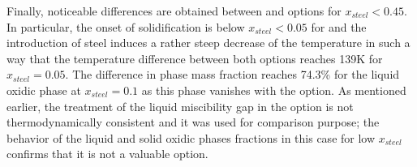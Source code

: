Finally, noticeable differences are obtained between  and  options for $x_{steel} < 0.45$. In particular, the onset of solidification is below $x_{steel} < 0.05$ for  and the introduction of steel induces a rather steep decrease of the temperature in such a way that the temperature difference between both options reaches 139K for $x_{steel} = 0.05$. The difference in phase mass fraction reaches 74.3\% for the liquid oxidic phase at $x_{steel} = 0.1$ as this phase vanishes with the  option. As mentioned earlier, the treatment of the liquid miscibility gap in the  option is not thermodynamically consistent and it was used for comparison purpose; the behavior of the liquid and solid oxidic phases fractions in this case for low $x_{steel}$ confirms that it is not a valuable option.


